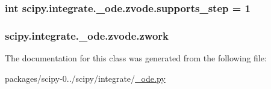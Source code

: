 \subsubsection[{supports\+\_\+step}]{\setlength{\rightskip}{0pt plus 5cm}int scipy.\+integrate.\+\_\+ode.\+zvode.\+supports\+\_\+step = 1\hspace{0.3cm}{\ttfamily [static]}}\label{classscipy_1_1integrate_1_1__ode_1_1zvode_afa704fe7a54b4b43282123a5f7e03fee}
\hypertarget{classscipy_1_1integrate_1_1__ode_1_1zvode_a7e1b71c02529147df0c06cc803d7dc24}{}
\subsubsection[{zwork}]{\setlength{\rightskip}{0pt plus 5cm}scipy.\+integrate.\+\_\+ode.\+zvode.\+zwork}\label{classscipy_1_1integrate_1_1__ode_1_1zvode_a7e1b71c02529147df0c06cc803d7dc24}


The documentation for this class was generated from the following file\+:\begin{DoxyCompactItemize}
\item 
packages/scipy-\/0../scipy/integrate/\hyperlink{__ode_8py}{\+\_\+ode.\+py}\end{DoxyCompactItemize}

